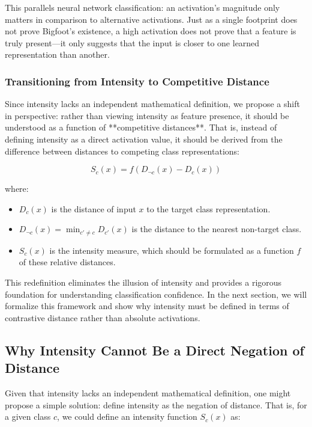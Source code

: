 \documentclass[12pt]{article}
\begin{document}
This parallels neural network classification: an activation’s magnitude only matters in comparison to alternative activations. Just as a single footprint does not prove Bigfoot’s existence, a high activation does not prove that a feature is truly present—it only suggests that the input is closer to one learned representation than another.

\subsubsection{Transitioning from Intensity to Competitive Distance}

Since intensity lacks an independent mathematical definition, we propose a shift in perspective: rather than viewing intensity as feature presence, it should be understood as a function of **competitive distances**. That is, instead of defining intensity as a direct activation value, it should be derived from the difference between distances to competing class representations:

\[
S_c(x) = f(D_{\neg c}(x) - D_c(x))
\]

where:

\begin{itemize}
    \item \( D_c(x) \) is the distance of input \( x \) to the target class representation.
    \item \( D_{\neg c}(x) = \min_{c' \neq c} D_{c'}(x) \) is the distance to the nearest non-target class.
    \item \( S_c(x) \) is the intensity measure, which should be formulated as a function \( f \) of these relative distances.
\end{itemize}

This redefinition eliminates the illusion of intensity and provides a rigorous foundation for understanding classification confidence. In the next section, we will formalize this framework and show why intensity must be defined in terms of contrastive distance rather than absolute activations.


\subsection{Why Intensity Cannot Be a Direct Negation of Distance}

Given that intensity lacks an independent mathematical definition, one might propose a simple solution: define intensity as the negation of distance. That is, for a given class \( c \), we could define an intensity function \( S_c(x) \) as:
\end{document}
